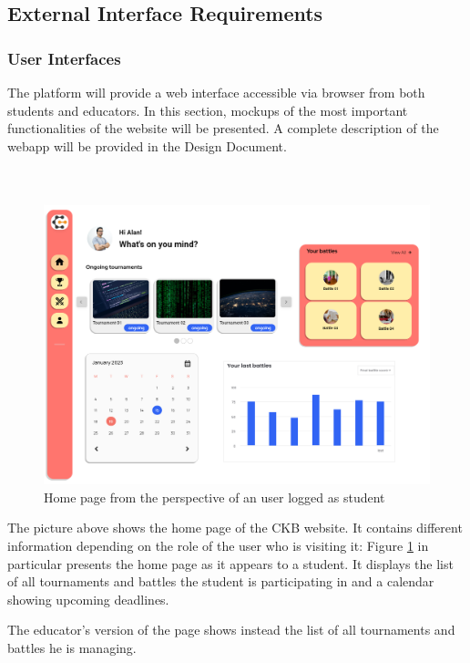 \subsection{External Interface Requirements}

\subsubsection{User Interfaces}
The platform will provide a web interface accessible via browser from both students and educators. In this section, mockups of the most important functionalities of the website will be presented. A complete description of the webapp will be provided in the Design Document. \\ \\ \\
\begin{figure}[H]
    \centering
    \includegraphics[width=1\textwidth]{Mockups/3_student_homepage.png}
    \caption{Home page from the perspective of an user logged as student}
    \label{fig:student_homepage}
\end{figure}
\newpage
\hfill \break
The picture above shows the home page of the CKB website. It contains different information depending on the role of the user who is visiting it: Figure \ref{fig:student_homepage} in particular presents the home page as it appears to a student. It displays the list of all tournaments and battles the student is participating in and a calendar showing upcoming deadlines.

The educator's version of the page shows instead the list of all tournaments and battles he is managing. \\ \\ \\ \\

